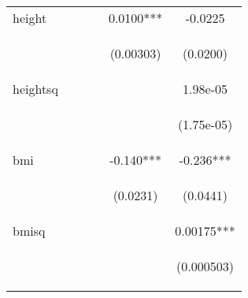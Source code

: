 \begin{table}[htpb!]
\begin{center}
{\begin{tabular}{lccccc}
height &  &  &  & 0.0100*** & -0.0225 \\
\vspace{4pt} & \begin{footnotesize}\end{footnotesize} & \begin{footnotesize}\end{footnotesize} & \begin{footnotesize}\end{footnotesize} & \begin{footnotesize}(0.00303)\end{footnotesize} & \begin{footnotesize}(0.0200)\end{footnotesize} \\
heightsq &  &  &  &  & 1.98e-05 \\
\vspace{4pt} & \begin{footnotesize}\end{footnotesize} & \begin{footnotesize}\end{footnotesize} & \begin{footnotesize}\end{footnotesize} & \begin{footnotesize}\end{footnotesize} & \begin{footnotesize}(1.75e-05)\end{footnotesize} \\
bmi &  &  &  & -0.140*** & -0.236*** \\
\vspace{4pt} & \begin{footnotesize}\end{footnotesize} & \begin{footnotesize}\end{footnotesize} & \begin{footnotesize}\end{footnotesize} & \begin{footnotesize}(0.0231)\end{footnotesize} & \begin{footnotesize}(0.0441)\end{footnotesize} \\
bmisq &  &  &  &  & 0.00175*** \\
\vspace{4pt} & \begin{footnotesize}\end{footnotesize} & \begin{footnotesize}\end{footnotesize} & \begin{footnotesize}\end{footnotesize} & \begin{footnotesize}\end{footnotesize} & \begin{footnotesize}(0.000503)\end{footnotesize} \\

\end{tabular}}
\end{center}
\end{table}
